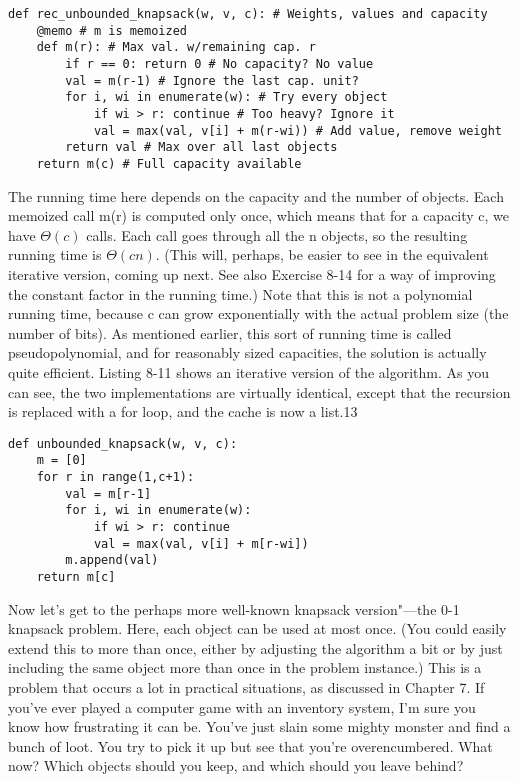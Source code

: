 \begin{lstlisting}[caption={A Memoized Recursive Solution to the Unbounded Integer Knapsack Problem}]
def rec_unbounded_knapsack(w, v, c): # Weights, values and capacity
    @memo # m is memoized
    def m(r): # Max val. w/remaining cap. r
        if r == 0: return 0 # No capacity? No value
        val = m(r-1) # Ignore the last cap. unit?
        for i, wi in enumerate(w): # Try every object
            if wi > r: continue # Too heavy? Ignore it
            val = max(val, v[i] + m(r-wi)) # Add value, remove weight
        return val # Max over all last objects
    return m(c) # Full capacity available
\end{lstlisting}
The running time here depends on the capacity and the number of objects. Each memoized call
m(r) is computed only once, which means that for a capacity c, we have $\Theta(c)$ calls. Each call goes through all the n objects, so the resulting running time is $\Theta(cn)$. (This will, perhaps, be easier to see in the equivalent iterative version, coming up next. See also Exercise 8-14 for a way of improving the constant factor in the running time.) Note that this is not a polynomial running time, because c can grow exponentially with the actual problem size (the number of bits). As mentioned earlier, this sort of running time is called pseudopolynomial, and for reasonably sized capacities, the solution is actually quite efficient.
Listing 8-11 shows an iterative version of the algorithm. As you can see, the two implementations
are virtually identical, except that the recursion is replaced with a for loop, and the cache is now a list.13

\begin{lstlisting}[caption={An Iterative Solution to the Unbounded Integer Knapsack Problem}]
def unbounded_knapsack(w, v, c):
    m = [0]
    for r in range(1,c+1):
        val = m[r-1]
        for i, wi in enumerate(w):
            if wi > r: continue
            val = max(val, v[i] + m[r-wi])
        m.append(val)
    return m[c]
\end{lstlisting}

Now let's get to the perhaps more well-known knapsack version"---the 0-1 knapsack problem. Here,
each object can be used at most once. (You could easily extend this to more than once, either by
adjusting the algorithm a bit or by just including the same object more than once in the problem
instance.) This is a problem that occurs a lot in practical situations, as discussed in Chapter 7. If you've ever played a computer game with an inventory system, I'm sure you know how frustrating it can be. You've just slain some mighty monster and find a bunch of loot. You try to pick it up but see that you're overencumbered. What now? Which objects should you keep, and which should you leave behind? 

